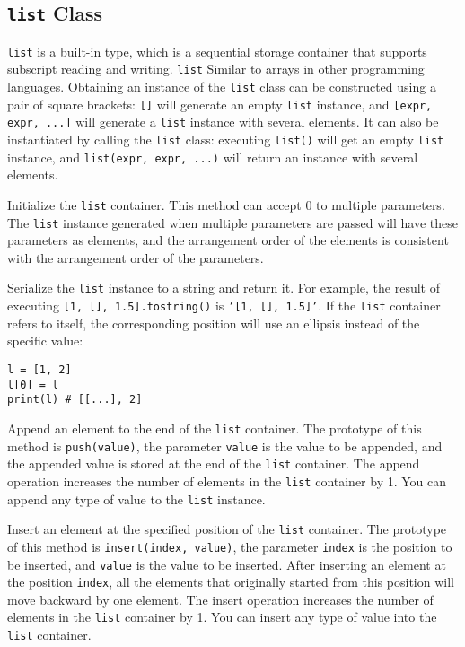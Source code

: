 \subsection{\texttt{list} Class}

\texttt{list} is a built-in type, which is a sequential storage container that supports subscript reading and writing. \texttt{list} Similar to arrays in other programming languages. Obtaining an instance of the \texttt{list} class can be constructed using a pair of square brackets: \texttt{[]} will generate an empty \texttt{list} instance, and \texttt{[expr, expr, ...]} will generate a \texttt{list} instance with several elements. It can also be instantiated by calling the \texttt{list} class: executing \texttt{list()} will get an empty \texttt{list} instance, and \texttt{list(expr, expr, ...)} will return an instance with several elements.


Initialize the \texttt{list} container. This method can accept 0 to multiple parameters. The \texttt{list} instance generated when multiple parameters are passed will have these parameters as elements, and the arrangement order of the elements is consistent with the arrangement order of the parameters.


Serialize the \texttt{list} instance to a string and return it. For example, the result of executing \texttt{[1, [], 1.5].tostring()} is \texttt{'[1, [], 1.5]'}. If the \texttt{list} container refers to itself, the corresponding position will use an ellipsis instead of the specific value:
\begin{lstlisting}[language=berry, numbers=none]
l = [1, 2]
l[0] = l
print(l) # [[...], 2]
\end{lstlisting}


Append an element to the end of the \texttt{list} container. The prototype of this method is \texttt{push(value)}, the parameter \texttt{value} is the value to be appended, and the appended value is stored at the end of the \texttt{list} container. The append operation increases the number of elements in the \texttt{list} container by 1. You can append any type of value to the \texttt{list} instance.

Insert an element at the specified position of the \texttt{list} container. The prototype of this method is \texttt{insert(index, value)}, the parameter \texttt{index} is the position to be inserted, and \texttt{value} is the value to be inserted. After inserting an element at the position \texttt{index}, all the elements that originally started from this position will move backward by one element. The insert operation increases the number of elements in the \texttt{list} container by 1. You can insert any type of value into the \texttt{list} container.


